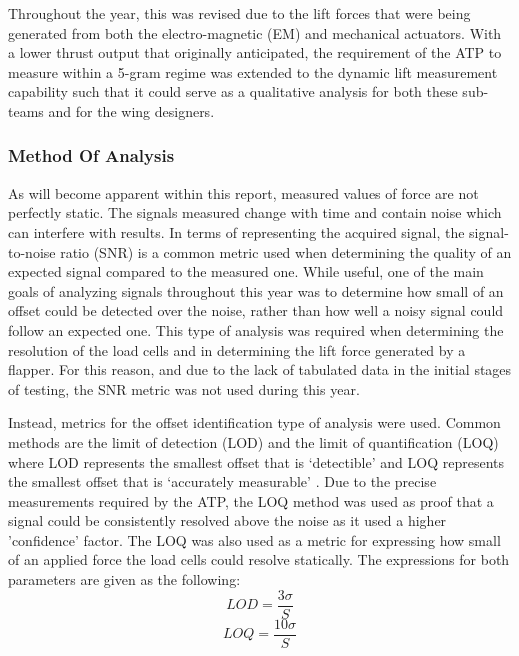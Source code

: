 Throughout the year, this was revised due to the lift forces that were being generated from both the electro-magnetic (EM) and mechanical actuators. With a lower thrust output that originally anticipated, the requirement of the ATP to measure within a 5-gram regime was extended to the dynamic lift measurement capability such that it could serve as a qualitative analysis for both these sub-teams and for the wing designers.

\subsubsection{Method Of Analysis}
As will become apparent within this report, measured values of force are not perfectly static. The signals measured change with time and contain noise which can interfere with results. In terms of representing the acquired signal, the signal-to-noise ratio (SNR) is a common metric used when determining the quality of an expected signal compared to the measured one. While useful, one of the main goals of analyzing signals throughout this year was to determine how small of an offset could be detected over the noise, rather than how well a noisy signal could follow an expected one. This type of analysis was required when determining the resolution of the load cells and in determining the lift force generated by a flapper. For this reason, and due to the lack of tabulated data in the initial stages of testing, the SNR metric was not used during this year.

Instead, metrics for the offset identification type of analysis were used. Common methods are the limit of detection (LOD) and the limit of quantification (LOQ) where LOD represents the smallest offset that is ‘detectible’ and LOQ represents the smallest offset that is ‘accurately measurable’ \cite{LODLOQ}. Due to the precise measurements required by the ATP, the LOQ method was used as proof that a signal could be consistently resolved above the noise as it used a higher 'confidence' factor. The LOQ was also used as a metric for expressing how small of an applied force the load cells could resolve statically. The expressions for both parameters are given as the following:
\begin{equation}
    \label{eq:LOD}
    LOD = \frac{3\sigma}{S}
\end{equation}
\begin{equation} 
    \label{eq:LOQ}
    LOQ = \frac{10\sigma}{S}
\end{equation}

